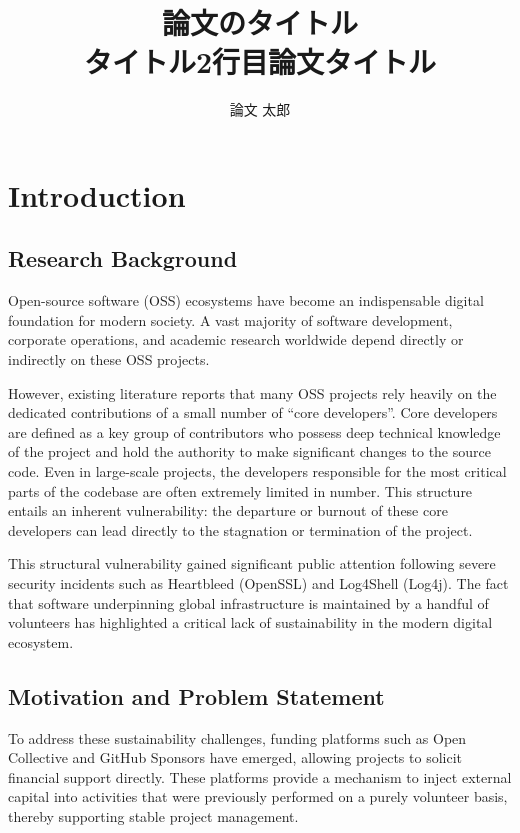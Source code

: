 \documentclass[11pt]{ist-thesis-lt}
\title{論文のタイトル\\タイトル2行目}
\author{論文 太郎}
\begin{document}
\titlepage{}

\title{論文タイトル}



\toc{}

\section{Introduction}

\subsection{Research Background}
Open-source software (OSS) ecosystems have become an indispensable digital foundation for modern society. A vast majority of software development, corporate operations, and academic research worldwide depend directly or indirectly on these OSS projects.

However, existing literature reports that many OSS projects rely heavily on the dedicated contributions of a small number of ``core developers''\cite{sample}. Core developers are defined as a key group of contributors who possess deep technical knowledge of the project and hold the authority to make significant changes to the source code. Even in large-scale projects, the developers responsible for the most critical parts of the codebase are often extremely limited in number\cite{sample}. This structure entails an inherent vulnerability: the departure or burnout of these core developers can lead directly to the stagnation or termination of the project.

This structural vulnerability gained significant public attention following severe security incidents such as Heartbleed (OpenSSL)\cite{sample} and Log4Shell (Log4j)\cite{sample}. The fact that software underpinning global infrastructure is maintained by a handful of volunteers has highlighted a critical lack of sustainability in the modern digital ecosystem\cite{sample}.

\subsection{Motivation and Problem Statement}
To address these sustainability challenges, funding platforms such as Open Collective\cite{sample} and GitHub Sponsors\cite{sample} have emerged, allowing projects to solicit financial support directly. These platforms provide a mechanism to inject external capital into activities that were previously performed on a purely volunteer basis, thereby supporting stable project management.
\end{document}
